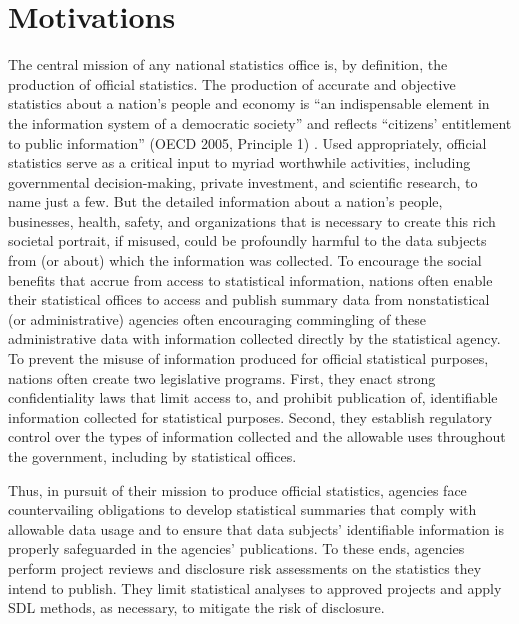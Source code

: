 \section{Motivations}
The central mission of any national statistics office is, by definition, the production of official statistics. The production of accurate and objective statistics about a nation's people and economy is ``an indispensable element in the information system of a democratic society'' and reflects ``citizens' entitlement to public information'' (OECD 2005, Principle 1) \cite{OECD}. Used appropriately, official statistics serve as a critical input to myriad worthwhile activities, including governmental decision-making, private investment, and scientific research, to name just a few. But the detailed information about a nation's people, businesses, health, safety, and organizations that is necessary to create this rich societal portrait, if misused, could be profoundly harmful to the data subjects from (or about) which the information was collected. To encourage the social benefits that accrue from access to statistical information, nations often enable their statistical offices to access and publish summary data from nonstatistical (or administrative) agencies often encouraging commingling of these administrative data with information collected directly by the statistical agency. To prevent the misuse of information produced for official statistical purposes, nations often create two legislative programs. First, they enact strong confidentiality laws that limit access to, and prohibit publication of, identifiable information collected for statistical purposes. Second, they establish regulatory control over the types of information collected and the allowable uses throughout the government, including by statistical offices.

Thus, in pursuit of their mission to produce official statistics, agencies face countervailing obligations to develop statistical summaries that comply with allowable data usage and to ensure that data subjects' identifiable information is properly safeguarded in the agencies' publications. To these ends, agencies perform project reviews and disclosure risk assessments on the statistics they intend to publish. They limit statistical analyses to approved projects and apply SDL methods, as necessary, to mitigate the risk of disclosure.

